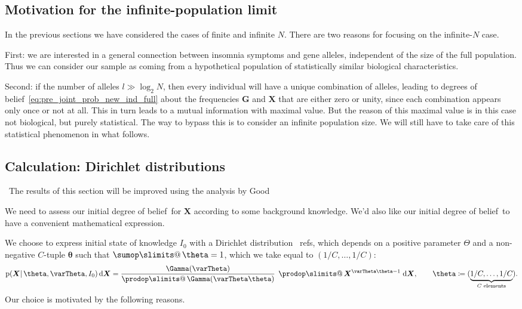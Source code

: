 \documentclass[\ifafour a4paper,12pt,\else a5paper,10pt,\fi%
onecolumn,oneside,article,%
british%
]{memoir}
\makeatletter
\theoremstyle{remark}
\theoremstyle{innote}
\def\sum{\DOTSI\sumop\slimits@}
\def\prod{\DOTSI\prodop\slimits@}
\newcommand*{\citep}{\parencites}
\newcommand*{\citey}{\parencites*}
\newcommand*{\di}{\mathrm{d}}%
\newcommand*{\defd}{\coloneqq}
\newcommand*{\pf}{\mathrm{p}}%
\renewcommand*{\|}{\mathpunct{|}}
\newcommand*{\sect}{\S}%
\newcommand*{\chaps}{chs}%
\newcommand*{\tprod}{\mathop{\textstyle\prod}\nolimits}
\newcommand*{\tsum}{\mathop{\textstyle\sum}\nolimits}
\newcommand*{\puzzle}{\maltese}
\newcommand{\mynote}[1]{ {\color{notecolour}\puzzle\ #1}}
\newcommand*{\dob}{degree of belief}
\newcommand*{\dobs}{degrees of belief}
\newcommand*{\ysum}{\tsum}
\newcommand*{\yprod}{\tprod}
\newcommand*{\yFg}{\bm{G}}
\newcommand*{\yF}{\bm{X}}
\newcommand*{\yIo}{I_{0}}
\newcommand*{\yA}{\varTheta}
\newcommand*{\ya}{\bm{\theta}}
\makeatother
\begin{document}
\subsection{Motivation for the infinite-population limit}
\label{sec:pre_motivation_Ninf}

In the previous sections we have considered the cases of finite and
infinite $N$. There are two reasons for focusing on the infinite-$N$ case.

First: we are interested in a general connection between
insomnia symptoms and gene alleles, independent of the size of the full
population. Thus we can consider our sample as coming from a hypothetical
population of statistically similar biological characteristics.

Second: if the number of alleles $l\gg\log_{2}N$, then every individual
will have a unique combination of alleles, leading to \dobs\
\eqref{eq:pre_joint_prob_new_ind_full} about the frequencies $\yFg$ and $\yF$
that are either zero or unity, since each combination appears only once or
not at all. This in turn leads to a mutual information with maximal value.
But the reason of this maximal value is in this case not biological, but
purely statistical. The way to bypass this is to consider an infinite
population size. We will still have to take care of this statistical
phenomenon in what follows.

\subsection{Calculation: Dirichlet distributions}
\label{sec:pre_2nd_calculation_unif_marginals}

\mynote{The results of this section will be improved using the analysis by
  Good \citey[\chaps~4--5]{good1965}{good1980}}


We need to assess our initial \dob\ for $\yF$ according to some background
knowledge. We'd also like our initial \dob\ to have a convenient
mathematical expression.

We choose to express initial state of knowledge $\yIo$ with a Dirichlet
distribution \mynote{refs}, which depends on a positive parameter $\yA$ and
a non-negative $C$-tuple $\ya$ such that $\ysum\ya=1$, which we take equal
to $(1/C,\dotsc,1/C)$:
\begin{equation}
  \label{eq:pre_dirichlet_prior}
  \pf(\yF \| \ya, \yA,\yIo)\,\di\yF =
  \frac{\Gamma(\yA)}{\yprod\Gamma(\yA\ya)}\;
  \yprod \yF^{\yA\ya-1}\;\di\yF,\qquad
  \ya \defd (\underbrace{1/C,\dotsc,1/C}_{\text{$C$ elements}}).
\end{equation}
Our choice is motivated by the following reasons.
\end{document}
